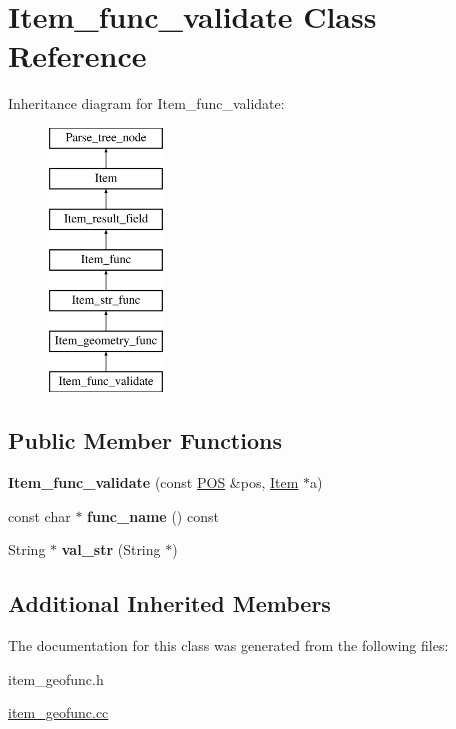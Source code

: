\hypertarget{classItem__func__validate}{}\section{Item\+\_\+func\+\_\+validate Class Reference}
\label{classItem__func__validate}
Inheritance diagram for Item\+\_\+func\+\_\+validate\+:\begin{figure}[H]
\begin{center}
\leavevmode
\includegraphics[height=7.000000cm]{classItem__func__validate}
\end{center}
\end{figure}
\subsection*{Public Member Functions}
\begin{DoxyCompactItemize}
\item 
\mbox{\label{classItem__func__validate_a64579a6a9b45fcece45074d5340ee4c5}} 
{\bfseries Item\+\_\+func\+\_\+validate} (const \mbox{\hyperlink{structYYLTYPE}{P\+OS}} \&pos, \mbox{\hyperlink{classItem}{Item}} $\ast$a)
\item 
\mbox{\label{classItem__func__validate_a8e574d889def89b6713c77a22c06d592}} 
const char $\ast$ {\bfseries func\+\_\+name} () const
\item 
\mbox{\label{classItem__func__validate_a8616203a1fec3d8814ad4c08757c8db9}} 
String $\ast$ {\bfseries val\+\_\+str} (String $\ast$)
\end{DoxyCompactItemize}
\subsection*{Additional Inherited Members}


The documentation for this class was generated from the following files\+:\begin{DoxyCompactItemize}
\item 
item\+\_\+geofunc.\+h\item 
\mbox{\hyperlink{item__geofunc_8cc}{item\+\_\+geofunc.\+cc}}\end{DoxyCompactItemize}
